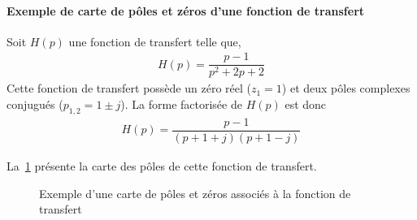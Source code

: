 \paragraph{Exemple de carte de pôles et zéros d'une fonction de transfert}

Soit $H(p)$ une fonction de transfert telle que,
\begin{align}
H(p)=\dfrac{p-1}{p^2+2p+2}\label{eq-ft_carte}
\end{align}
Cette fonction de transfert possède un zéro réel ($z_1=1$) et deux 
pôles complexes conjugués ($p_{1,2}=1\pm j$).
La forme factorisée de $H(p)$ est donc
\begin{align} 
    H(p)=\dfrac{p-1}{(p+1+j)(p+1-j)}
\end{align}

La~\cref{fig-carte} présente la carte des pôles de cette fonction de transfert.
\begin{figure}[!h]
\begin{center}
\end{center}
\caption{Exemple d'une carte de pôles et zéros associés 
    à la fonction de transfert~\label{fig-carte} }
\end{figure}
